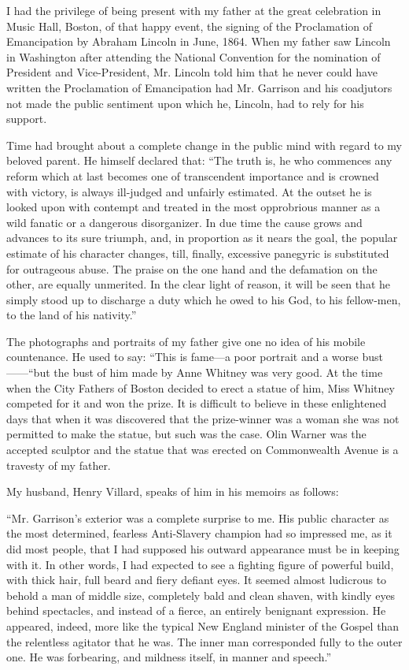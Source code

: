 \documentclass{book}
\begin{document}
I had the privilege of being present with my father at the great celebration in Music Hall, Boston, of that happy event, the signing of the Proclamation of Emancipation by Abraham Lincoln in June, 1864. When my father saw Lincoln in Washington after attending the National Convention for the nomination of President and Vice-President, Mr. Lincoln told him that he never could have written the Proclamation of Emancipation had Mr. Garrison and his coadjutors not made the public sentiment upon which he, Lincoln, had to rely for his support.

Time had brought about a complete change in the public mind with regard to my beloved parent. He himself declared that: “The truth is, he who commences any reform which at last becomes one of transcendent importance and is crowned with victory, is always ill-judged and unfairly estimated. At the outset he is looked upon with contempt and treated in the most opprobrious manner as a wild fanatic or a dangerous disorganizer. In due time the cause grows and advances to its sure triumph, and, in proportion as it nears the goal, the popular estimate of his character changes, till, finally, excessive panegyric is substituted for outrageous abuse. The praise on the one hand and the defamation on the other, are equally unmerited. In the clear light of reason, it will be seen that he simply stood up to discharge a duty which he owed to his God, to his fellow-men, to the land of his nativity.”

The photographs and portraits of my father give one no idea of his mobile countenance. He used to say: “This is fame—a poor portrait and a worse bust——“but the bust of him made by Anne Whitney was very good. At the time when the City Fathers of Boston decided to erect a statue of him, Miss Whitney competed for it and won the prize. It is difficult to believe in these enlightened days that when it was discovered that the prize-winner was a woman she was not permitted to make the statue, but such was the case. Olin Warner was the accepted sculptor and the statue that was erected on Commonwealth Avenue is a travesty of my father.

My husband, Henry Villard, speaks of him in his memoirs as follows:

“Mr. Garrison’s exterior was a complete surprise to me. His public character as the most determined, fearless Anti-Slavery champion had so impressed me, as it did most people, that I had supposed his outward appearance must be in keeping with it. In other words, I had expected to see a fighting figure of powerful build, with thick hair, full beard and fiery defiant eyes. It seemed almost ludicrous to behold a man of middle size, completely bald and clean shaven, with kindly eyes behind spectacles, and instead of a fierce, an entirely benignant expression. He appeared, indeed, more like the typical New England minister of the Gospel than the relentless agitator that he was. The inner man corresponded fully to the outer one. He was forbearing, and mildness itself, in manner and speech.”
\end{document}
